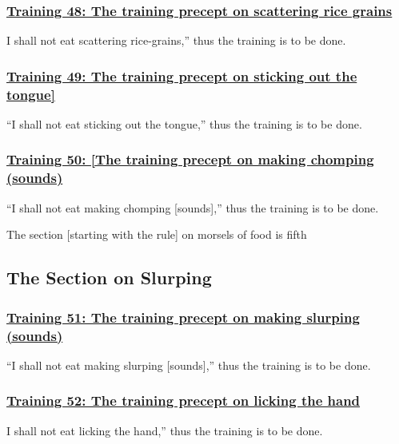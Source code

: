 \subsubsection*{\hyperref[sekh48]{Training 48: The training precept on scattering rice grains}}
\label{training48}
I shall not eat scattering rice-grains,'' thus the training is to be done.



\subsubsection*{\hyperref[sekh49]{Training 49: The training precept on sticking out the tongue]}}
\label{training49}
``I shall not eat sticking out the tongue,'' thus the training is to be done.



\subsubsection*{\hyperref[sekh50]{Training 50: [The training precept on making chomping (sounds)}}
\label{training50}
``I shall not eat making chomping [sounds],'' thus the training is to be done.

\begin{center}
	The section [starting with the rule] on morsels of food is fifth
\end{center}



\setsubsecheadstyle{\subsectionFmt}
\subsection{The Section on Slurping}
\label{trainings-vagga6}

\subsubsection*{\hyperref[sekh51]{Training 51: The training precept on making slurping (sounds)}}
\label{training51}
``I shall not eat making slurping [sounds],'' thus the training is to be done.



\subsubsection*{\hyperref[sekh52]{Training 52: The training precept on licking the hand}}
\label{training52}
I shall not eat licking the hand,'' thus the training is to be done.



